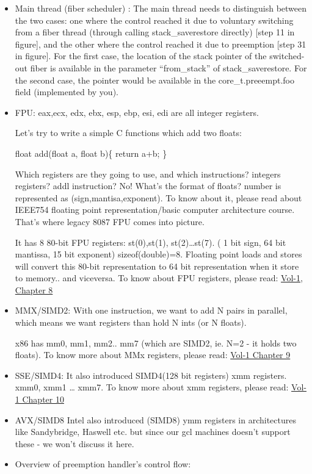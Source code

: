\documentclass[]{article}
\newenvironment{Shaded}{}{}
\newcommand{\DataTypeTok}[1]{\textcolor[rgb]{0.50,0.00,0.00}{{#1}}}
\newcommand{\ControlFlowTok}[1]{{#1}}
\newcommand{\NormalTok}[1]{{#1}}
\begin{document}
\begin{itemize}
\item
  Main thread (fiber scheduler) : The main thread needs to distinguish
  between the two cases: one where the control reached it due to
  voluntary switching from a fiber thread (through calling
  stack\_saverestore directly) {[}step 11 in figure{]}, and the other
  where the control reached it due to preemption {[}step 31 in
  figure{]}. For the first case, the location of the stack pointer of
  the switched-out fiber is available in the parameter ``from\_stack''
  of stack\_saverestore. For the second case, the pointer would be
  available in the core\_t.preeempt.foo field (implemented by you).
\item
  FPU: eax,ecx, edx, ebx, esp, ebp, esi, edi are all integer registers.

  Let's try to write a simple C functions which add two floats:

\begin{Shaded}
\begin{Highlighting}[]
\DataTypeTok{float} \NormalTok{add(}\DataTypeTok{float} \NormalTok{a, }\DataTypeTok{float} \NormalTok{b)\{}
   \ControlFlowTok{return} \NormalTok{a+b;}
\NormalTok{\}}
\end{Highlighting}
\end{Shaded}

  Which registers are they going to use, and which instructions?
  integers registers? addl instruction? No! What's the format of floats?
  number is represented as (sign,mantisa,exponent). To know about it,
  please read about IEEE754 floating point representation/basic computer
  architecture course. That's where legacy 8087 FPU comes into picture.

  It has 8 80-bit FPU registers: st(0),st(1), st(2)\ldots{}st(7). ( 1
  bit sign, 64 bit mantissa, 15 bit exponent) sizeof(double)=8. Floating
  point loads and stores will convert this 80-bit representation to 64
  bit representation when it store to memory.. and viceversa. To know
  about FPU registers, please read:
  \href{http://www.cse.iitd.ac.in/~deepak/lab1/intel.pdf}{Vol-1, Chapter
  8}
\item
  MMX/SIMD2: With one instruction, we want to add N pairs in parallel,
  which means we want registers than hold N ints (or N floats).

  x86 has mm0, mm1, mm2.. mm7 (which are SIMD2, ie. N=2 - it holds two
  floats). To know more about MMx registers, please read:
  \href{http://www.cse.iitd.ac.in/~deepak/hohlabs/intel.pdf}{Vol-1
  Chapter 9}
\item
  SSE/SIMD4: It also introduced SIMD4(128 bit registers) xmm registers.
  xmm0, xmm1 \ldots{} xmm7. To know more about xmm registers, please
  read: \href{http://www.cse.iitd.ac.in/~deepak/hohlabs/intel.pdf}{Vol-1
  Chapter 10}
\item
  AVX/SIMD8 Intel also introduced (SIMD8) ymm registers in architectures
  like Sandybridge, Haswell etc. but since our gcl machines doesn't
  support these - we won't discuss it here.
\item
  Overview of preemption handler's control flow:
\end{itemize}
\end{document}
